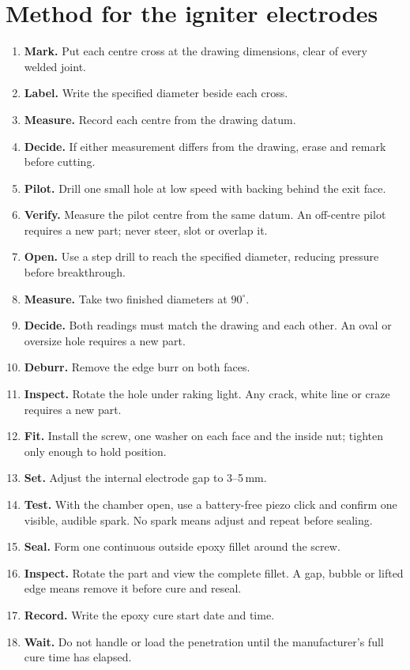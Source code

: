 \section{Method for the igniter electrodes}
\begin{enumerate}
\item \textbf{Mark.} Put each centre cross at the drawing dimensions, clear of
every welded joint. 
\item \textbf{Label.} Write the specified diameter beside each cross.
\item \textbf{Measure.} Record each centre from the drawing datum.
\item \textbf{Decide.} If either measurement differs from the drawing, erase
and remark before cutting.
\item \textbf{Pilot.} Drill one small hole at low speed with backing behind the
exit face.
\item \textbf{Verify.} Measure the pilot centre from the same datum. An
off-centre pilot requires a new part; never steer, slot or overlap it.
\item \textbf{Open.} Use a step drill to reach the specified diameter, reducing
pressure before breakthrough.
\item \textbf{Measure.} Take two finished diameters at $90^\circ$.
\item \textbf{Decide.} Both readings must match the drawing and each other. An
oval or oversize hole requires a new part.
\item \textbf{Deburr.} Remove the edge burr on both faces.
\item \textbf{Inspect.} Rotate the hole under raking light. Any crack, white
line or craze requires a new part.
\item \textbf{Fit.} Install the screw, one washer on each face and the inside
nut; tighten only enough to hold position.
\item \textbf{Set.} Adjust the internal electrode gap to 3--5\,mm.
\item \textbf{Test.} With the chamber open, use a battery-free piezo click and
confirm one visible, audible spark. No spark means adjust and repeat before
sealing.
\item \textbf{Seal.} Form one continuous outside epoxy fillet around the screw.
\item \textbf{Inspect.} Rotate the part and view the complete fillet. A gap,
bubble or lifted edge means remove it before cure and reseal.
\item \textbf{Record.} Write the epoxy cure start date and time.
\item \textbf{Wait.} Do not handle or load the penetration until the
manufacturer's full cure time has elapsed.
\end{enumerate}

